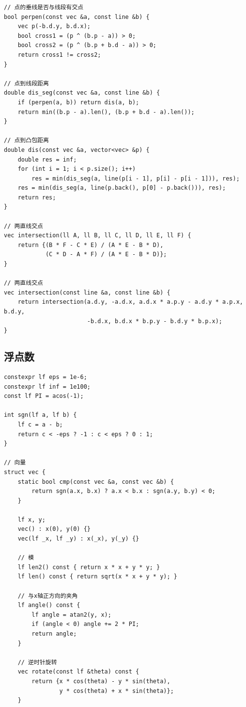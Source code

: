 \documentclass[UTF8]{ctexart}
\begin{document}
\begin{sloppypar}
\begin{lstlisting}[style=cpp]
// 点的垂线是否与线段有交点
bool perpen(const vec &a, const line &b) {
    vec p(-b.d.y, b.d.x);
    bool cross1 = (p ^ (b.p - a)) > 0;
    bool cross2 = (p ^ (b.p + b.d - a)) > 0;
    return cross1 != cross2;
}

// 点到线段距离
double dis_seg(const vec &a, const line &b) {
    if (perpen(a, b)) return dis(a, b);
    return min((b.p - a).len(), (b.p + b.d - a).len());
}

// 点到凸包距离
double dis(const vec &a, vector<vec> &p) {
    double res = inf;
    for (int i = 1; i < p.size(); i++)
        res = min(dis_seg(a, line(p[i - 1], p[i] - p[i - 1])), res);
    res = min(dis_seg(a, line(p.back(), p[0] - p.back())), res);
    return res;
}

// 两直线交点
vec intersection(ll A, ll B, ll C, ll D, ll E, ll F) {
    return {(B * F - C * E) / (A * E - B * D),
            (C * D - A * F) / (A * E - B * D)};
}

// 两直线交点
vec intersection(const line &a, const line &b) {
    return intersection(a.d.y, -a.d.x, a.d.x * a.p.y - a.d.y * a.p.x, b.d.y,
                        -b.d.x, b.d.x * b.p.y - b.d.y * b.p.x);
}
\end{lstlisting}

\subsection{浮点数}

\begin{lstlisting}[style=cpp]
constexpr lf eps = 1e-6;
constexpr lf inf = 1e100;
const lf PI = acos(-1);

int sgn(lf a, lf b) {
    lf c = a - b;
    return c < -eps ? -1 : c < eps ? 0 : 1;
}

// 向量
struct vec {
    static bool cmp(const vec &a, const vec &b) {
        return sgn(a.x, b.x) ? a.x < b.x : sgn(a.y, b.y) < 0;
    }

    lf x, y;
    vec() : x(0), y(0) {}
    vec(lf _x, lf _y) : x(_x), y(_y) {}

    // 模
    lf len2() const { return x * x + y * y; }
    lf len() const { return sqrt(x * x + y * y); }

    // 与x轴正方向的夹角
    lf angle() const {
        lf angle = atan2(y, x);
        if (angle < 0) angle += 2 * PI;
        return angle;
    }

    // 逆时针旋转
    vec rotate(const lf &theta) const {
        return {x * cos(theta) - y * sin(theta),
                y * cos(theta) + x * sin(theta)};
    }


\end{lstlisting}
\end{sloppypar}
\end{document}
